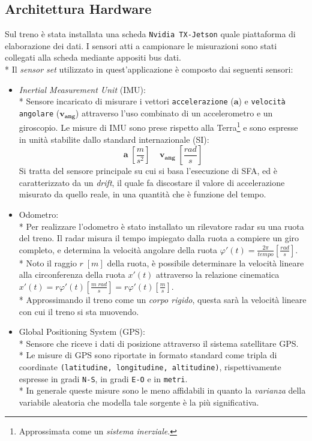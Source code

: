 \subsection{Architettura Hardware}
Sul treno \`e stata installata una scheda \texttt{Nvidia TX-Jetson} quale piattaforma di elaborazione dei dati. I sensori atti a campionare le misurazioni sono stati collegati alla scheda mediante appositi bus dati.\\*
Il \emph{sensor set} utilizzato in quest'applicazione \`e composto dai seguenti sensori:
\begin{itemize}
	\item \emph{Inertial Measurement Unit} (IMU):\\*
	Sensore incaricato di misurare i vettori \texttt{accelerazione} ($\mathbf{a}$) e \texttt{velocit\`a angolare} ($\mathbf{v_{ang}}$) attraverso l'uso combinato di un accelerometro e un giroscopio. Le misure di IMU sono prese rispetto alla Terra\footnote{Approssimata come un \emph{sistema inerziale}.} e sono espresse in unit\`a stabilite dallo standard internazionale (SI):
	$$
	\mathbf{a}\;\left[\frac{m}{s^2}\right]\;\;\;\;\mathbf{v_{ang}}\;\left[ \frac{rad}{s} \right]
	$$Si tratta del sensore principale su cui si basa l'esecuzione di SFA, ed \`e caratterizzato da un \emph{drift}, il quale fa discostare il valore di accelerazione misurato da quello reale, in una quantit\`a che \`e funzione del tempo.
	\item Odometro:\\*
	Per realizzare l'odometro \`e stato installato un rilevatore radar su una ruota del treno. Il radar misura il tempo impiegato dalla ruota a compiere un giro completo, e determina la velocit\`a angolare della ruota $\varphi'(t) = \frac{2\pi}{tempo} \left[ \frac{rad}{s}\right]$.\\*
	Noto il raggio $r\;[m]$ della ruota, \`e possibile determinare la velocit\`a lineare alla circonferenza della ruota  $x'(t)$ attraverso la relazione cinematica $x'(t) = r\varphi'(t) \left[ \frac{m\;rad}{s}\right] = r\varphi'(t) \left[ \frac{m}{s} \right]$.\\*
	Approssimando il treno come un \emph{corpo rigido}, questa sar\`a la velocit\`a lineare con cui il treno si sta muovendo.
	\item Global Positioning System (GPS):\\*
	Sensore che riceve i dati di posizione attraverso il sistema satellitare GPS.\\*
	Le misure di GPS sono riportate in formato standard come tripla di coordinate \texttt{(latitudine, longitudine, altitudine)}, rispettivamente espresse in gradi \texttt{N-S}, in gradi \texttt{E-O} e in \texttt{metri}.\\*
	In generale queste misure sono le meno affidabili in quanto la \emph{varianza} della variabile aleatoria che modella tale sorgente \`e la pi\`u significativa.
\end{itemize}
